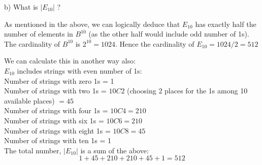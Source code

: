 \documentclass[14pt]{extreport}
\begin{document}
\begin{enumerate}[label=(\alph*)]
b) What is $|E_{10}|$ ?
\newline

As mentioned in the above, we can logically deduce that $E_{10}$ has exactly half the number of elements in $B^{10}$ (as the other half would include odd number of 1s). The cardinality of $B^{10}$ is $2^{10} = 1024$. Hence the cardinality of $E_{10} = 1024/2 = 512$
\newline

We can calculate this in another way also:\\
$E_{10}$ includes strings with even number of 1s:\\
Number of strings with zero 1s = 1\\
Number of strings with two 1s = $10C2$ (choosing 2 places for the 1s among 10 available places) $= 45$\\
Number of strings with four 1s = $10C4 = 210$\\
Number of strings with six 1s = $10C6 = 210$\\
Number of strings with eight 1s = $10C8 = 45$\\
Number of strings with ten 1s = 1\\
The total number, $|E_{10}|$ is a sum of the above:\\
\[ 1 + 45 + 210 + 210 + 45 + 1 = 512\] \\

\end{enumerate}
\newpage
\end{document}
